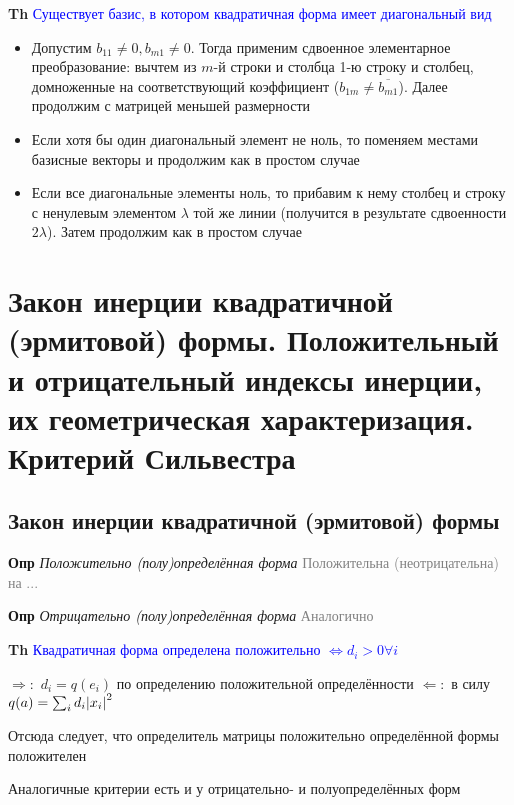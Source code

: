\documentclass[a4paper, 14pt]{article}
\begin{document}
    \textbf{Th} \textcolor{blue}{Существует базис, в котором квадратичная форма имеет диагональный вид}
    
    \begin{itemize}
        \item Допустим $b_{11} \neq 0, b_{m1} \neq 0$.
        Тогда применим сдвоенное элементарное преобразование: вычтем из $m$-й строки и столбца 1-ю строку и столбец,
        домноженные на соответствующий коэффициент ($b_{1m} \neq \overline{b_{m1}}$).
        Далее продолжим с матрицей меньшей размерности
        \item Если хотя бы один диагональный элемент не ноль, то поменяем местами базисные векторы и продолжим
        как в простом случае
        \item Если все диагональные элементы ноль, то прибавим к нему столбец и строку с ненулевым элементом $\lambda$
        той же
        линии (получится в результате сдвоенности $2\lambda$). Затем продолжим как в простом случае
    \end{itemize}
    
    \section{Закон инерции квадратичной (эрмитовой) формы.
    Положительный и отрицательный индексы инерции, их геометрическая характеризация.
    Критерий Сильвестра}
    
    \subsection{Закон инерции квадратичной (эрмитовой) формы}
    
    \textbf{Опр} \textit{Положительно (полу)определённая форма} \textcolor{gray}{Положительна (неотрицательна) на ...}
    
    \textbf{Опр} \textit{Отрицательно (полу)определённая форма} \textcolor{gray}{Аналогично}
    
    \textbf{Th} \textcolor{blue}{Квадратичная форма определена положительно $\Leftrightarrow d_i > 0 \forall i$}
    
    $\Rightarrow:$ $d_i = q(e_i)$ по определению положительной определённости
    $\Leftarrow:$ в силу $q(a) = \sum_i d_i \abs{x_i}^2$
    
    Отсюда следует, что определитель матрицы положительно определённой формы положителен
    
    Аналогичные критерии есть и у отрицательно- и полуопределённых форм
    
\end{document}
